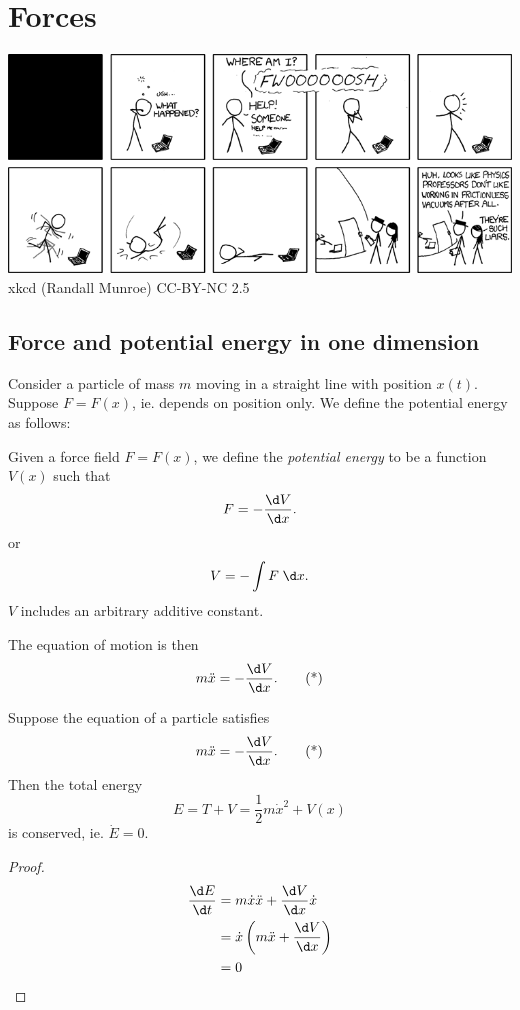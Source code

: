 \documentclass[a4paper]{article}
\begin{document}
\section{Forces}
\begin{center}
  \includegraphics[scale=.45]{images/xkcd_experiment.png}\\
  xkcd (Randall Munroe) CC-BY-NC 2.5
\end{center}
\subsection{Force and potential energy in one dimension}
Consider a particle of mass $m$ moving in a straight line with position $x(t)$. Suppose $F = F(x)$, ie. depends on position only. We define the potential energy as follows:
\begin{defi}
  Given a force field $F = F(x)$, we define the \emph{potential energy} to be a function $V(x)$ such that
  \[
    F = -\frac{\d V}{\d x}.
  \]
  or
  \[
    V = -\int F \;\d x.
  \]
  $V$ includes an arbitrary additive constant.
\end{defi}

The equation of motion is then
\[
  m\ddot{x} = -\frac{\d V}{\d x}.\tag{*}
\]

\begin{prop}
  Suppose the equation of a particle satisfies
  \[
    m\ddot{x} = -\frac{\d V}{\d x}.\tag{*}
  \]
  Then the total energy
  \[
    E = T + V = \frac{1}{2} m\dot{x}^2 + V(x)
  \]
  is conserved, ie. $\dot{E} = 0$.
\end{prop}

\begin{proof}
  \begin{align*}
    \frac{\d E}{\d t} &= m\dot{x}\ddot{x} + \frac{\d V}{\d x}\dot{x}\\
    &= \dot{x}\left(m\ddot{x} + \frac{\d V}{\d x}\right)\\
    &= 0
  \end{align*}
\end{proof}
\end{document}
